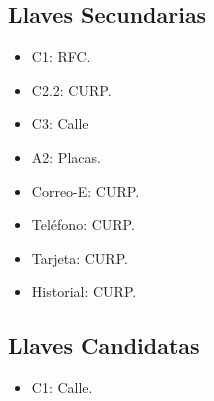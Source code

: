\documentclass{article}
\begin{document}
      \subsection{Llaves Secundarias}
      \begin{multicols}{3}
        \begin{itemize}
        \item C1: RFC.
        \item C2.2: CURP.
        \item C3: Calle
        \item A2: Placas.
        \item Correo-E: CURP.
        \item Teléfono: CURP.
        \item Tarjeta: CURP.
        \item Historial: CURP.
        \end{itemize}
      \end{multicols}
         
      \subsection{Llaves Candidatas}
      \begin{itemize}
      \item C1: Calle.
      \end{itemize}
      
           
           
\end{document}
